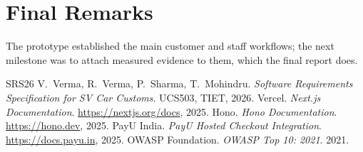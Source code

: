 \documentclass{tietreport}
\begin{document}
\section{Final Remarks}
The prototype established the main customer and staff workflows; the next
milestone was to attach measured evidence to them, which the final report
does.

\begin{thebibliography}{SRS26}
 V.~Verma, R.~Verma, P.~Sharma, T.~Mohindru. \emph{Software Requirements Specification for SV Car Customs}. UCS503, TIET, 2026.
 Vercel. \emph{Next.js Documentation}. \url{https://nextjs.org/docs}, 2025.
 Hono. \emph{Hono Documentation}. \url{https://hono.dev}, 2025.
 PayU India. \emph{PayU Hosted Checkout Integration}. \url{https://docs.payu.in}, 2025.
 OWASP Foundation. \emph{OWASP Top 10: 2021}. 2021.
\end{thebibliography}
\end{document}
